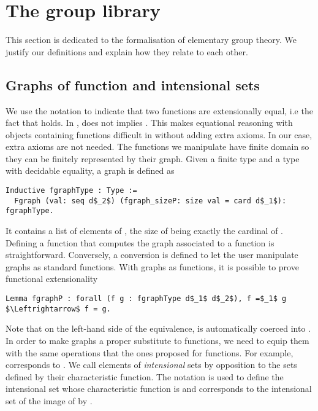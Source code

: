 \section{The group library}

This section is dedicated to the formalisation of elementary group
theory. We justify our definitions and explain how they relate to each other.

\subsection{Graphs of function and intensional sets}
We use the notation  to indicate that
two functions are extensionally equal, i.e  the fact that
 holds. In \Coq, 
does not implies . This makes equational reasoning
with objects containing functions difficult in \Coq{}
without adding extra axioms. In our case, extra axioms are not needed.
The functions we manipulate have finite domain so they can be finitely
represented by their graph. Given  a finite type and 
a type with decidable equality, a graph is defined as

\begin{lstlisting}
Inductive fgraphType : Type := 
  Fgraph (val: seq d$_2$) (fgraph_sizeP: size val = card d$_1$): fgraphType.
\end{lstlisting}
It contains a list  of elements of , the size of  being
exactly the cardinal of . Defining
a function  that computes the graph associated to a function
is straightforward.
Conversely, a conversion  is defined to 
let the user manipulate graphs as standard functions.
With graphs as functions, it is possible to prove functional extensionality
\begin{lstlisting}
Lemma fgraphP : forall (f g : fgraphType d$_1$ d$_2$), f =$_1$ g $\Leftrightarrow$ f = g.
\end{lstlisting}
Note that on the left-hand side of the equivalence,  is automatically
coerced into .
In order to make graphs a proper substitute to functions, we need
to equip them  with the same operations that  the ones proposed for 
functions. For example,  corresponds to .
We call elements of   \emph{intensional} sets by opposition to the sets defined
by their characteristic function. The notation  is used
to define the intensional set whose characteristic function is 
and  corresponds to the intensional set of the image of  by .

